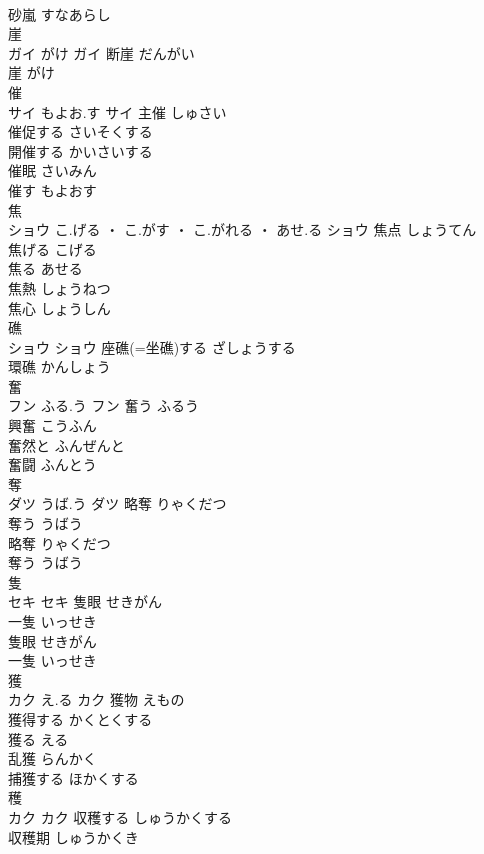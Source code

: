 \documentclass[8pt]{extreport}
\begin{document}
\begin{CJK}{UTF8}{min}
\\	砂嵐	すなあらし	
\\	崖	
\\	ガイ	がけ	ガイ	断崖	だんがい	
\\	崖	がけ	
\\	催	
\\	サイ	もよお.す	サイ	主催	しゅさい	
\\	催促する	さいそくする	
\\	開催する	かいさいする	
\\	催眠	さいみん	
\\	催す	もよおす	
\\	焦	
\\	ショウ	こ.げる ・ こ.がす ・ こ.がれる ・ あせ.る	ショウ	焦点	しょうてん	
\\	焦げる	こげる	
\\	焦る	あせる	
\\	焦熱	しょうねつ	
\\	焦心	しょうしん	
\\	礁	
\\	ショウ		ショウ	座礁(=坐礁)する	ざしょうする	
\\	環礁	かんしょう	
\\	奮	
\\	フン	ふる.う	フン	奮う	ふるう	
\\	興奮	こうふん	
\\	奮然と	ふんぜんと	
\\	奮闘	ふんとう	
\\	奪	
\\	ダツ	うば.う	ダツ	略奪	りゃくだつ	
\\	奪う	うばう	
\\	略奪	りゃくだつ	
\\	奪う	うばう	
\\	隻	
\\	セキ		セキ	隻眼	せきがん	
\\	一隻	いっせき	
\\	隻眼	せきがん	
\\	一隻	いっせき	
\\	獲	
\\	カク	え.る	カク	獲物	えもの	
\\	獲得する	かくとくする	
\\	獲る	える	
\\	乱獲	らんかく	
\\	捕獲する	ほかくする	
\\	穫	
\\	カク		カク	収穫する	しゅうかくする	
\\	収穫期	しゅうかくき	

\end{CJK}
\end{document}
